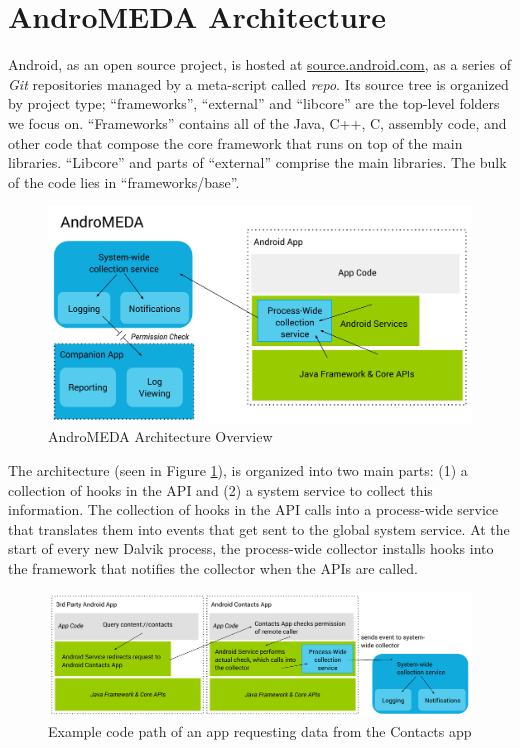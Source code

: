 \section{AndroMEDA Architecture}
Android, as an open source project, is hosted at \url{source.android.com}\citep{androidsource}, as a series of \textit{Git} repositories managed by a meta-script called \textit{repo}. Its source tree is organized by project type; ``frameworks'', ``external'' and ``libcore'' are the top-level folders we focus on. ``Frameworks'' contains all of the Java, C++, C, assembly code, and other code that compose the core framework that runs on top of the main libraries. ``Libcore'' and parts of ``external'' comprise the main libraries. The bulk of the code lies in ``frameworks/base''.


\begin{figure}[t]
\begin{center}
\includegraphics[width=1.0\columnwidth]{figs/AndroMEDA-Architecture-Overview}
\caption{AndroMEDA Architecture Overview}
\label{fig:andromedaoverview}
\end{center}
\end{figure}

The architecture (seen in Figure \ref{fig:andromedaoverview}), is organized into two main parts: (1) a collection of hooks in the API and (2) a system service to collect this information. The collection of hooks in the API calls into a process-wide service that translates them into events that get sent to the global system service. At the start of every new Dalvik process, the process-wide collector installs hooks into the framework that notifies the collector when the APIs are called.

\begin{figure}[t]
\begin{center}
\includegraphics[width=1.0\columnwidth]{figs/AndroMEDA-Inter-App-Example}
\caption{Example code path of an app requesting data from the Contacts app}
\label{fig:interapp-example}
\end{center}
\end{figure}

